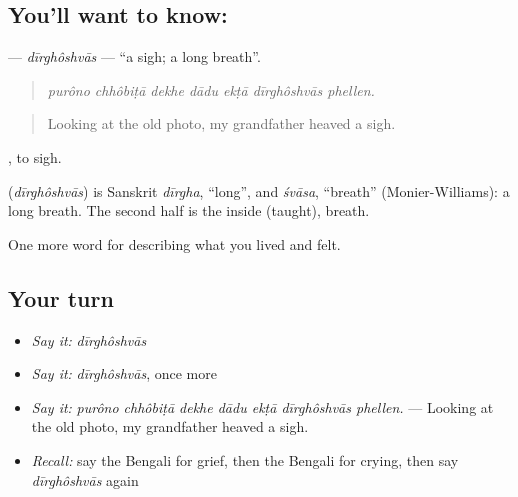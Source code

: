 \subsection*{You'll want to know: }
\textbf{} — \emph{dīrghôshvās} — \textquotedblleft{}a sigh; a long breath\textquotedblright{}.

\begin{quote}
      
\end{quote}

\begin{quote}
\emph{purôno chhôbiṭā dekhe dādu ekṭā dīrghôshvās phellen.}
\end{quote}

\begin{quote}
Looking at the old photo, my grandfather heaved a sigh.
\end{quote}

 , to sigh.

\begin{cousinweb}
\textbf{} (\emph{dīrghôshvās}) is Sanskrit \emph{dīrgha}, \textquotedblleft{}long\textquotedblright{}, and \emph{śvāsa}, \textquotedblleft{}breath\textquotedblright{} (Monier-Williams): a long breath. The second half is the  inside  (taught), breath.
\end{cousinweb}

\begin{grammarlens}[title={What you've built}]
One more word for describing what you lived and felt.
\end{grammarlens}

\subsection*{Your turn}
\begin{itemize}
\raggedright
  \item \emph{Say it:} \emph{dīrghôshvās}
  \item \emph{Say it:} \emph{dīrghôshvās}, once more
  \item \emph{Say it:} \emph{purôno chhôbiṭā dekhe dādu ekṭā dīrghôshvās phellen.} — Looking at the old photo, my grandfather heaved a sigh.
  \item \emph{Recall:} say the Bengali for grief, then the Bengali for crying, then say \emph{dīrghôshvās} again
\end{itemize}

